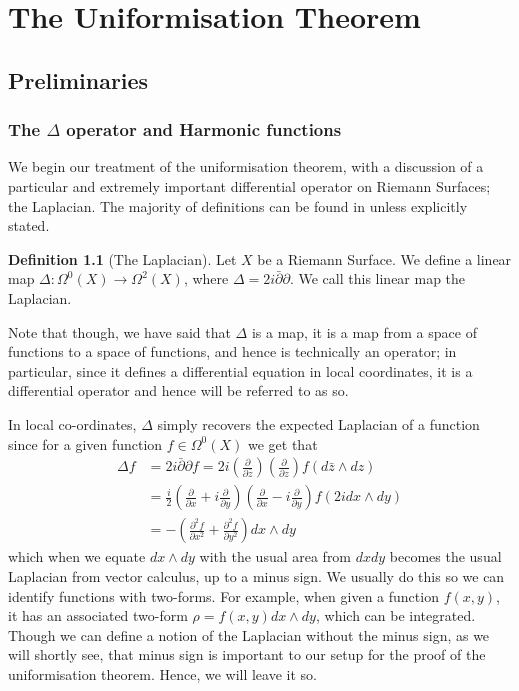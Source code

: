 \documentclass[a4paper,12pt]{report}
\theoremstyle{plain}
\theoremstyle{definition}
\newtheorem{defn}[thm]{Definition}
\begin{document}
\chapter{The Uniformisation Theorem}
\section{Preliminaries}
\subsection{The $\Delta$ operator and Harmonic functions}
We begin our treatment of the uniformisation theorem, with a discussion of a particular and extremely important differential operator on Riemann Surfaces; the Laplacian. The majority of definitions can be found in \cite{donaldson} unless explicitly stated.

\begin{defn}[The Laplacian]\label{LaplacianDef}
  Let $X$ be a Riemann Surface. We define a linear map $\Delta:\Omega^0(X)\rightarrow \Omega^2(X)$, where $\Delta=2i\bar{\partial}\partial$. We call this linear map the Laplacian.
\end{defn}

Note that though, we have said that $\Delta$ is a map, it is a map from a space of functions to a space of functions, and hence is technically an operator; in particular, since it defines a differential equation in local coordinates, it is a differential operator and hence will be referred to as so.

In local co-ordinates, $\Delta$ simply recovers the expected Laplacian of a function since for a given function $f\in \Omega^0(X)$ we get that 
\begin{align*}
  \Delta f &= 2i\bar{\partial }\partial f = 2i(\frac{\partial}{\partial\bar{z}})(\frac{\partial}{\partial z})f(d\bar{z}\wedge dz) \\
  &=\frac{i}{2}(\frac{\partial}{\partial x} + i\frac{\partial}{\partial y})(\frac{\partial}{\partial x} - i\frac{\partial}{\partial y})f(2idx\wedge dy) \\
  &= -(\frac{\partial^2 f}{\partial x^2} + \frac{\partial^2 f}{\partial y^2})dx\wedge dy 
\end{align*}
which when we equate $dx\wedge dy$ with the usual area from $dxdy$ becomes the usual Laplacian from vector calculus, up to a minus sign. We usually do this so we can identify functions with two-forms. For example, when given a function $f(x,y)$, it has an associated two-form $\rho = f(x,y) dx\wedge dy$, which can be integrated. Though we can define a notion of the Laplacian without the minus sign, as we will shortly see, that minus sign is important to our setup for the proof of the uniformisation theorem. Hence, we will leave it so. 
\end{document}
